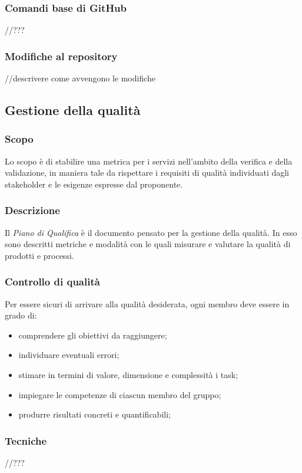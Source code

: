 \subsubsection{Comandi base di GitHub}
//???
\subsubsection{Modifiche al repository}
//descrivere come avvengono le modifiche

\subsection{Gestione della qualità}
\subsubsection{Scopo}
Lo scopo è di stabilire una metrica per i servizi nell’ambito della verifica e della validazione, in maniera tale da rispettare i requisiti di qualità individuati dagli stakeholder e le esigenze espresse dal proponente.

\subsubsection{Descrizione}
Il \textit{Piano di Qualifica} è il documento pensato per la gestione della qualità. In esso sono descritti metriche e modalità con le quali misurare e valutare la qualità di prodotti e processi.  

\subsubsection{Controllo di qualità}
Per essere sicuri di arrivare alla qualità desiderata, ogni membro deve essere in grado di:
\begin{itemize}
\item comprendere gli obiettivi da raggiungere;
\item individuare eventuali errori;
\item stimare in termini di valore, dimensione e complessità i task;
\item impiegare le competenze di ciascun membro del gruppo;
\item produrre risultati concreti e quantificabili;

\end{itemize}

\subsubsection{Tecniche}
//???


